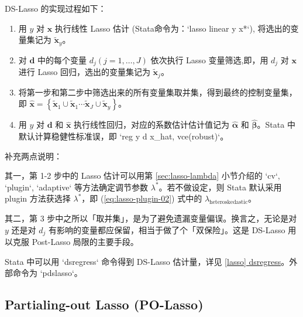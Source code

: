 \vspace{5pt}
DS-Lasso 的实现过程如下：
\begin{enumerate}
\item 用 $y$ 对 $\mathbf{x}$ 执行线性 Lasso 估计 (Stata命令为：`lasso linear y x*`), 将选出的变量集记为 $\widetilde{\mathbf{x}}_{y}$。
\item 对 $\mathbf{d}$ 中的每个变量 $d_{j} (j=1, \ldots, J)$ 依次执行 Lasso 变量筛选,即，用 $d_{j}$ 对 $\mathbf{x}$ 进行 Lasso 回归，选出的变量集记为 $\widetilde{\mathbf{x}}_{j}$。
\item 将第一步和第二步中筛选出来的所有变量集取并集，得到最终的控制变量集，即  $\widehat{\mathbf{x}} = \left\{\widetilde{\mathbf{x}}_{1} \cup \widetilde{\mathbf{x}}_{1} \cdots \widetilde{\mathbf{x}}_{J} \cup \widetilde{\mathbf{x}}_{y}\right\}$。
\item 用 $y$ 对 $\mathbf{d}$ 和 $\widehat{\mathbf{x}}$ 执行线性回归，对应的系数估计估计值记为 $\widehat{\boldsymbol{\alpha}}$ 和 $\widehat{\boldsymbol{\beta}}$。Stata 中默认计算稳健性标准误，即 `reg y d x\_hat, vce(robust)`。
\end{enumerate}
补充两点说明：

其一，第 1-2 步中的 Lasso 估计可以用第 \ref{sec:lasso-lambda} 小节介绍的 `cv`, `plugin`, `adaptive` 等方法确定调节参数 $\lambda^*$。若不做设定，则 Stata 默认采用 plugin 方法获选择 $\lambda^*$，即 (\ref{eq:lasso-plugin-02}) 式中的 $\lambda_{\text {heteroskedastic}}$。

其二，第 3 步中之所以「取并集」，是为了避免遗漏变量偏误。换言之，无论是对 $y$ 还是对 $d_j$ 有影响的变量都应保留，相当于做了个「双保险」。这是 DS-Lasso 用以克服 Post-Lasso 局限的主要手段。
 


Stata 中可以用 `dsregress` 命令得到 DS-Lasso 估计量，详见 \href{https://www.stata.com/manuals/lassodsregress.pdf}{[lasso] dsregress}。外部命令为 `pdslasso`。





\subsection{Partialing-out Lasso (PO-Lasso)}\label{sec:polasso}

